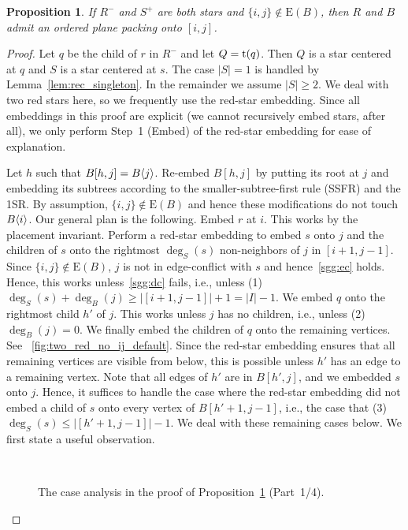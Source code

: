 \documentclass[11pt,a4paper,colorlinks=true,urlcolor=blue,citecolor=red]{article}
\theoremstyle{plain}
\newtheorem{proposition}[theorem]{Proposition}
\newcommand{\EB}{\mathrm{E}(B)}
\begin{document}
\begin{proposition}\label{prop:rec_large_red_star_ij_not_used_sp_star}
  If $R^-$ and $S^+$ are both stars and $\{i,j\}\not\in\EB$,
  then $R$ and $B$ admit an ordered plane packing onto $[i,j]$.
\end{proposition}
\begin{proof}
  Let $q$ be the child of $r$ in $R^-$ and let $Q=\mathrm t(q)$. Then $Q$ is a
  star centered at $q$ and $S$ is a star centered at $s$. The case
  $|S|=1$ is handled by Lemma~\ref{lem:rec_singleton}. In the remainder
  we assume $|S|\geq 2$.  We deal with two red stars here, so we
  frequently use the red-star embedding. Since all embeddings in this
  proof are explicit (we cannot recursively embed stars, after all), we
  only perform Step~1 (Embed) of the red-star embedding for ease of
  explanation.

  Let $h$ such that $B[h,j]=B\langle{j}\rangle$. Re-embed $B[h,j]$ by putting
  its root at $j$ and embedding its subtrees according to the
  smaller-subtree-first rule (SSFR) and the 1SR. By assumption,
  $\{i,j\}\not\in\EB$ and hence these modifications do not touch
  $B\langle{i}\rangle$. Our general plan is the following. Embed $r$ at $i$.
  This works by the placement invariant. Perform a red-star
  embedding to embed $s$ onto $j$ and the children of $s$ onto the
  rightmost $\deg_S(s)$ non-neighbors of $j$ in $[i+1,j-1]$. Since
  $\{i,j\}\not\in\EB$, $j$ is not in edge-conflict with $s$ and
  hence~\ref{sgg:ec} holds. Hence, this works unless~\ref{sgg:dc} fails,
  i.e., unless (1) $\deg_S(s)+\deg_B(j)\geq |[i+1,j-1]|+1=|I|-1$. We
  embed $q$ onto the rightmost child $h'$ of $j$. This works unless $j$
  has no children, i.e., unless (2) $\deg_B(j)=0$. We finally embed the
  children of $q$ onto the remaining vertices. See
  \figurename~\ref{fig:two_red_no_ij_default}. Since the
  red-star embedding ensures that all remaining vertices are
  visible from below, this is possible unless $h'$ has an edge to a
  remaining vertex. Note that all edges of $h'$ are in $B[h',j]$, and we
  embedded $s$ onto $j$. Hence, it suffices to handle the case where the
  red-star embedding did not embed a child of $s$ onto every
  vertex of $B[h'+1,j-1]$, i.e., the case that (3)
  $\deg_S(s)\leq|[h'+1,j-1]|-1$. We deal with these remaining cases
  below. We first state a useful observation.

  \begin{figure}[b]
    \centering\hfil {}\hfil {}\hfil {}\\
    \hfil {}\hfil \label{fig:two_red_no_ij_1}
    \caption{The case analysis in the proof of
      Proposition~\ref{prop:rec_large_red_star_ij_not_used_sp_star}
      (Part~1/4).}
  \end{figure}



\end{proof}
\end{document}
